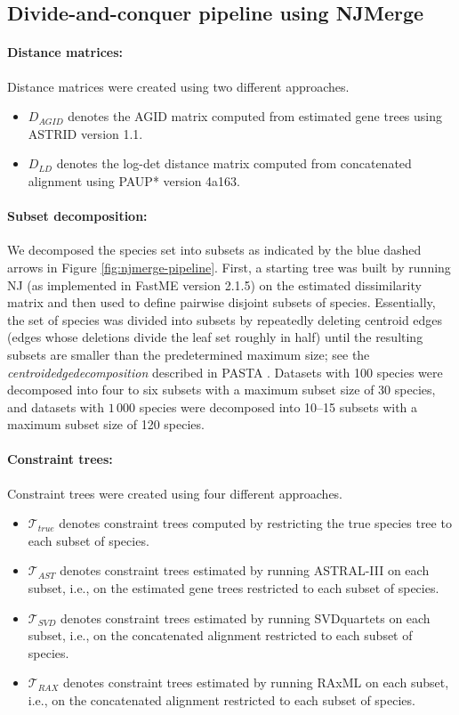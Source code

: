 \subsection{Divide-and-conquer pipeline using NJMerge}
\paragraph{Distance matrices:} Distance matrices were created using two different approaches.
\begin{itemize}
	\item $D_{AGID}$ denotes the AGID matrix computed from estimated gene trees using \gls{ASTRID} version 1.1.
	\item $D_{LD}$ denotes the log-det distance matrix computed from concatenated alignment using PAUP* version 4a163.
\end{itemize}

\paragraph{Subset decomposition:}  
We decomposed the species set into subsets as indicated by the blue dashed arrows in Figure \ref{fig:njmerge-pipeline}.
First, a starting tree was built by running NJ (as implemented in \gls{FastME} version 2.1.5) on the estimated dissimilarity matrix and then used to define pairwise disjoint subsets of species.
Essentially, the set of species was divided into subsets by repeatedly deleting centroid edges (edges whose deletions divide the leaf set roughly in half) until the resulting subsets are smaller than the predetermined maximum size; see the \textit{\gls{centroidedgedecomposition}} described in PASTA \cite{mirarab2015pasta}.
Datasets with 100 species were decomposed into four to six subsets with a maximum subset size of 30 species, and datasets with $1\,000$ species were decomposed into 10--15 subsets with a maximum subset size of 120 species.

\paragraph{Constraint trees:}
Constraint trees were created using four different approaches.
\begin{itemize}
     \item $\mathcal{T}_{true}$ denotes constraint trees computed by restricting the true species tree to each subset of species.
	\item $\mathcal{T}_{AST}$ denotes constraint trees estimated by running ASTRAL-III on each subset, i.e., on the estimated gene trees restricted to each subset of species.
	\item $\mathcal{T}_{SVD}$  denotes constraint trees estimated by running SVDquartets on each subset, i.e., on the concatenated alignment restricted to each subset of species.
	\item $\mathcal{T}_{RAX}$  denotes constraint trees estimated by running RAxML on each subset, i.e., on the concatenated alignment restricted to each subset of species.
\end{itemize}


